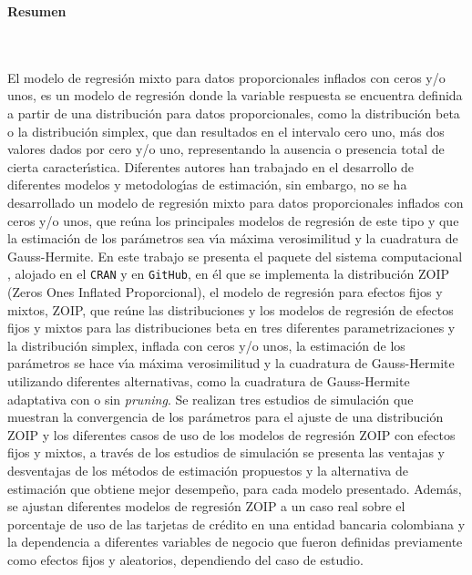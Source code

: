 \newpage
\textbf{\LARGE Resumen}
\\\\
El modelo de regresi\'{o}n mixto para datos proporcionales inflados con ceros y/o unos, es un modelo de regresi\'{o}n donde la variable respuesta se encuentra definida a partir de una distribuci\'{o}n para datos proporcionales, como la distribuci\'{o}n beta o la distribuci\'{o}n simplex, que dan resultados en el intervalo cero uno, m\'{a}s dos valores dados por cero y/o uno, representando la ausencia o presencia total de cierta caracter\'{\i}stica. Diferentes autores han trabajado en el desarrollo de diferentes modelos y metodolog\'{\i}as de estimaci\'{o}n, sin embargo, no se ha desarrollado un modelo de regresi\'{o}n mixto para datos proporcionales inflados con ceros y/o unos, que re\'{u}na los principales modelos de regresi\'{o}n de este tipo y que la estimaci\'{o}n de los par\'{a}metros sea v\'{\i}a m\'{a}xima verosimilitud y la cuadratura de Gauss-Hermite. En este trabajo se presenta el paquete  del sistema computacional , alojado en el \verb|CRAN| y en \verb|GitHub|, en \'{e}l que se implementa la distribuci\'{o}n ZOIP (Zeros Ones Inflated Proporcional), el modelo de regresi\'{o}n para efectos fijos y mixtos, ZOIP, que re\'{u}ne las distribuciones y los modelos de regresi\'{o}n de efectos fijos y mixtos para las distribuciones beta en tres diferentes parametrizaciones y la distribuci\'{o}n simplex, inflada con ceros y/o unos, la estimaci\'{o}n de los par\'{a}metros se hace v\'{\i}a m\'{a}xima verosimilitud y la cuadratura de Gauss-Hermite utilizando diferentes alternativas, como la cuadratura de Gauss-Hermite adaptativa con o sin \textit{pruning}. Se realizan tres estudios de simulaci\'{o}n que muestran la convergencia de los par\'{a}metros para el ajuste de una distribuci\'{o}n ZOIP y los diferentes casos de uso de los modelos de regresi\'{o}n ZOIP con efectos fijos y mixtos, a trav\'{e}s de los estudios de simulaci\'{o}n se presenta las ventajas y desventajas de los m\'{e}todos de estimaci\'{o}n propuestos y la alternativa de estimaci\'{o}n que obtiene mejor desempe\~{n}o, para cada modelo presentado. Adem\'{a}s, se ajustan diferentes modelos de regresi\'{o}n ZOIP a un caso real sobre el porcentaje de uso de las tarjetas de cr\'{e}dito en una entidad bancaria colombiana y la dependencia a di\-fe\-ren\-tes va\-ria\-bles de negocio que fueron definidas previamente como efectos fijos y aleatorios, dependiendo del caso de estudio.\\

